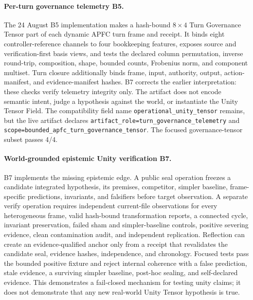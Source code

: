 \documentclass[10pt,twocolumn]{article}
\theoremstyle{definition}
\theoremstyle{plain}
\theoremstyle{remark}
\newcommand{\file}[1]{\nolinkurl{#1}}
\newcommand{\turnunity}{\textsf{B5}}
\newcommand{\epistemicunity}{\textsf{B7}}
\begin{document}
\paragraph{Per-turn governance telemetry \turnunity.}
The 24 August B5 implementation makes a hash-bound $8\times4$ Turn Governance Tensor part of each dynamic APFC turn frame and receipt.  It binds eight controller-reference channels to four bookkeeping features, exposes source and verification-first basis views, and tests the declared column permutation, inverse round-trip, composition, shape, bounded counts, Frobenius norm, and component multiset.  Turn closure additionally binds frame, input, authority, output, action-manifest, and evidence-manifest hashes.  B7 corrects the earlier interpretation: these checks verify telemetry integrity only.  The artifact does not encode semantic intent, judge a hypothesis against the world, or instantiate the Unity Tensor Field.  The compatibility field name \file{operational\_unity\_tensor} remains, but the live artifact declares \file{artifact\_role=turn\_governance\_telemetry} and \file{scope=bounded\_apfc\_turn\_governance\_tensor}.  The focused governance-tensor subset passes 4/4.

\paragraph{World-grounded epistemic Unity verification \epistemicunity.}
B7 implements the missing epistemic edge.  A public seal operation freezes a candidate integrated hypothesis, its premises, competitor, simpler baseline, frame-specific predictions, invariants, and falsifiers before target observation.  A separate verify operation requires independent current-file observations for every heterogeneous frame, valid hash-bound transformation reports, a connected cycle, invariant preservation, failed sham and simpler-baseline controls, positive severing evidence, clean contamination audit, and independent replication.  Reflection can create an evidence-qualified anchor only from a receipt that revalidates the candidate seal, evidence hashes, independence, and chronology.  Focused tests pass the bounded positive fixture and reject internal coherence with a false prediction, stale evidence, a surviving simpler baseline, post-hoc sealing, and self-declared evidence.  This demonstrates a fail-closed mechanism for testing unity claims; it does not demonstrate that any new real-world Unity Tensor hypothesis is true.
\end{document}
